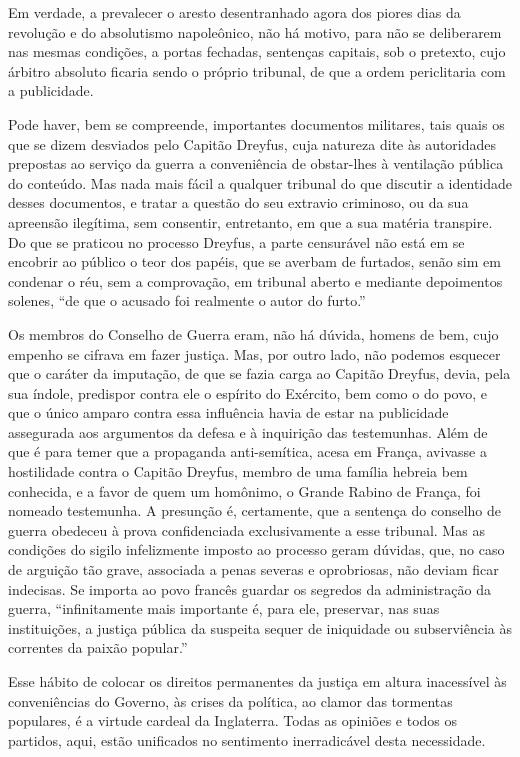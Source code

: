 \begin{hedraquote}
Em verdade, a prevalecer o aresto desentranhado agora dos piores dias da
revolução e do absolutismo napoleônico, não há motivo, para não se
deliberarem nas mesmas condições, a portas fechadas, sentenças
capitais, sob o pretexto, cujo árbitro absoluto ficaria sendo o próprio
tribunal, de que a ordem periclitaria com a publicidade.

Pode haver, bem se compreende, importantes documentos militares, tais
quais os que se dizem desviados pelo Capitão Dreyfus, cuja natureza
dite às autoridades prepostas ao serviço da guerra a conveniência de
obstar-lhes à ventilação pública do conteúdo. Mas nada mais fácil a
qualquer tribunal do que discutir a identidade desses documentos, e
tratar a questão do seu extravio criminoso, ou da sua apreensão
ilegítima, sem consentir, entretanto, em que a sua matéria transpire.
Do que se praticou no processo Dreyfus, a parte censurável não está em
se encobrir ao público o teor dos papéis, que se averbam de furtados,
senão sim em condenar o réu, sem a comprovação, em tribunal aberto e
mediante depoimentos solenes, ``de que o acusado foi
realmente o autor do furto.''

Os membros do Conselho de Guerra eram, não há dúvida, homens de bem,
cujo empenho se cifrava em fazer justiça. Mas, por outro lado, não
podemos esquecer que o caráter da imputação, de que se fazia carga ao
Capitão Dreyfus, devia, pela sua índole, predispor contra ele o
espírito do Exército, bem como o do povo, e que o único amparo contra
essa influência havia de estar na publicidade assegurada aos argumentos
da defesa e à inquirição das testemunhas. Além de que é para temer que
a propaganda anti-semítica, acesa em França, avivasse a hostilidade
contra o Capitão Dreyfus, membro de uma família hebreia bem conhecida,
e a favor de quem um homônimo, o Grande Rabino de França, foi nomeado
testemunha. A presunção é, certamente, que a sentença do conselho de
guerra obedeceu à prova confidenciada exclusivamente a esse tribunal.
Mas as condições do sigilo infelizmente imposto ao processo geram
dúvidas, que, no caso de arguição tão grave, associada a penas severas
e oprobriosas, não deviam ficar indecisas. Se importa ao povo francês
guardar os segredos da administração da guerra,
``infinitamente mais importante é, para ele, preservar,
nas suas instituições, a justiça pública da suspeita sequer de
iniquidade ou subserviência às correntes da paixão popular.''
\end{hedraquote}

Esse hábito de colocar os direitos permanentes da justiça em altura
inacessível às conveniências do Governo, às crises da política, ao
clamor das tormentas populares, é a virtude cardeal da Inglaterra.
Todas as opiniões e todos os partidos, aqui, estão unificados no
sentimento inerradicável desta necessidade.

